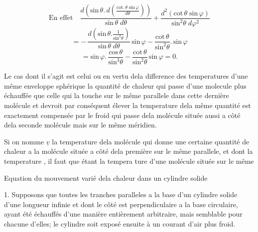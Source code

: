 \documentclass[11pt,a4paper]{article}
\begin{document}
\[ \text{En effet}\quad \frac{d\left(\text{sin}\,\theta.\,d\left(\frac{\text{cot.}\,\theta\;\text{sin}\,\varphi}{d\theta}\right)\right)}{\text{sin}\,\theta\;d\theta} + \frac{d^{2}(\text{cot}\,\theta\;\text{sin}\,\varphi)}{\text{sin}^{2}\theta\;d\varphi^{2}} \]
\[ = -\,\frac{d\left(\text{sin}\,\theta.\frac{1}{\text{sin}^{2}\theta}\right)}{\text{sin}\,\theta\;d\theta}\,\text{sin}\,\varphi - \frac{\text{cot}\,\theta}{\text{sin}^{2}\theta}.\,\text{sin}\,\varphi \]
\[ = \text{sin}\,\varphi.\,\frac{\text{cos}\,\theta}{\text{sin}^{3}\theta} - \frac{\text{cot}\,\theta}{\text{sin}^{2}\theta}\,\text{sin}\,\varphi = 0. \]

Le cas dont il s'agit est celui ou en vertu dela
difference des temperatures  d'une même enveloppe sphérique
la quantité de chaleur qui passe d'une molecule plus
échauffée que celle qui la touche sur le même parallele
dans cette dernière molécule et devroit par conséquent
élever la temperature dela même quantité est exactement
compensée par le froid qui passe dela molécule située
aussi a côté dela seconde molécule mais sur le même
méridien.

Si on nomme $\underline{v}$ la temperature dela molécule
qui donne une certaine quantité de chaleur a la molécule
située a côté dela première sur le même parallele, et dont
la temperature , il faut que  étant la tempera
ture d'une  molécule située sur le même



Equation du mouvement varié dela chaleur dans un
cylindre solide

1. Supposons que toutes les tranches paralleles a la base d'un
cylindre solide d'une longueur infinie et dont le côté est
perpendiculaire a la base circulaire, ayant été échauffés
d'une manière entièrement arbitraire, mais semblable pour
chacune d'elles; le cylindre soit exposé ensuite à un
courant d'air plus froid.
\end{document}
